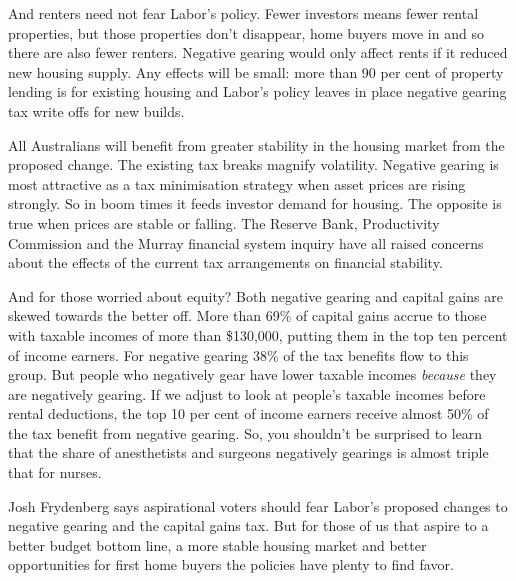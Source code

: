 \documentclass[b5paper,11pt]{article}\usepackage[]{graphicx}\usepackage[]{color}
\begin{document}
And renters need not fear Labor's policy. Fewer investors means fewer
rental properties, but those properties don't disappear, home buyers
move in and so there are also fewer renters. Negative gearing would only
affect rents if it reduced new housing supply. Any effects will be
small: more than 90 per cent of property lending is for existing housing
and Labor's policy leaves in place negative gearing tax write offs for
new builds.

All Australians will benefit from greater stability in the housing
market from the proposed change. The existing tax breaks magnify
volatility. Negative gearing is most attractive as a tax minimisation
strategy when asset prices are rising strongly. So in boom times it
feeds investor demand for housing. The opposite is true when prices are
stable or falling. The Reserve Bank, Productivity Commission and the
Murray financial system inquiry have all raised concerns about the
effects of the current tax arrangements on financial stability.

And for those worried about equity? Both negative gearing and capital
gains are skewed towards the better off. More than 69\% of
capital gains accrue to those with taxable incomes of more than \$130,000,
putting them in the top ten percent of income earners. For negative
gearing 38\% of the tax benefits flow to this group. But people
who negatively gear have lower taxable incomes \emph{because} they are
negatively gearing. If we adjust to look at people's taxable incomes
before rental deductions, the top 10 per cent of income earners receive
almost 50\% of the tax benefit from negative gearing. So, you
shouldn't be surprised to learn that the share of anesthetists and
surgeons negatively gearings is almost triple that for nurses.

Josh Frydenberg says aspirational voters should fear Labor's proposed
changes to negative gearing and the capital gains tax. But for those of
us that aspire to a better budget bottom line, a more stable housing
market and better opportunities for first home buyers the policies have
plenty to find favor.
\end{document}
